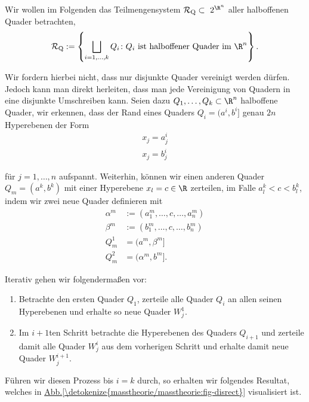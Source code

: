\documentclass[letterpaper,10pt,german]{jupyterBook}
\begin{document}
\par
Wir wollen im Folgenden das Teilmengensystem \(\mathcal{R}_{\text{Q}}\subset\ 2^{\R^n}\) aller halboffenen Quader betrachten,
\begin{align*}
\mathcal{R}_{\text{Q}} := \left\{ \bigsqcup_{i=1,\ldots,k} Q_i \colon Q_i \text{ ist halboffener Quader im } \R^n \right\}.
\end{align*}
\par
Wir fordern hierbei nicht, dass nur disjunkte Quader vereinigt werden dürfen. Jedoch kann man direkt herleiten, dass man jede Vereinigung von Quadern in eine disjunkte Umschreiben kann. Seien dazu \(Q_1,\ldots,Q_k\subset\R^n\) halboffene Quader, wir erkennen, dass der Rand eines Quaders \(Q_i=(a^i,b^i]\) genau \(2n\) Hyperebenen der Form
\begin{align*}
x_j = a^i_j\\
x_j = b^i_j
\end{align*}
\par
für \(j=1,\ldots,n\) aufspannt. Weiterhin, können wir einen anderen Quader \(Q_m=(a^k,b^k)\) mit einer Hyperebene \(x_l=c\in\R\) zerteilen, im Falle \(a^k_l < c < b^k_l\), indem wir zwei neue Quader definieren mit
\begin{align*}
\alpha^m&:=(a^m_1,\ldots,c,\ldots,a^m_n)\\
\beta^m&:=(b^m_1,\ldots,c,\ldots,b^m_n)\\
Q_m^1&=(a^m,\beta^m]\\
Q_m^2&=(\alpha^m,b^m].
\end{align*}
\par
Iterativ gehen wir folgendermaßen vor:
\begin{enumerate}

\item {} 
\par
Betrachte den ersten Quader \(Q_1\), zerteile alle Quader \(Q_i\) an allen seinen Hyperebenen und erhalte so neue Quader \(W^1_j\).

\item {} 
\par
Im \(i+1\)ten Schritt betrachte die Hyperebenen des Quaders \(Q_{i+1}\) und zerteile damit alle Quader \(W^i_j\) aus dem vorherigen Schritt und erhalte damit neue Quader \(W^{i+1}_j\).

\end{enumerate}

\par
Führen wir diesen Prozess bis \(i=k\) durch, so erhalten wir folgendes Resultat, welches in \hyperref[\detokenize{masstheorie/masstheorie:fig-disrect}]{Abb.\@ \ref{\detokenize{masstheorie/masstheorie:fig-disrect}}} visualisiert ist.
\end{document}
